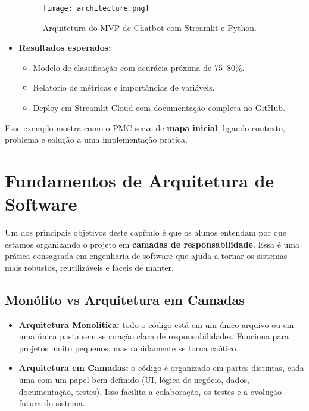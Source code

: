 \documentclass[12pt,a4paper]{article}
\begin{document}
\begin{itemize}
    \begin{figure}[H]
      \centering
      \texttt{[image: architecture.png]}
      \caption{Arquitetura do MVP de Chatbot com Streamlit e Python.}
    \end{figure}


  \item \textbf{Resultados esperados:}  
  \begin{itemize}
    \item Modelo de classificação com acurácia próxima de 75--80\%.  
    \item Relatório de métricas e importâncias de variáveis.  
    \item Deploy em Streamlit Cloud com documentação completa no GitHub.  
  \end{itemize}
\end{itemize}

Esse exemplo mostra como o PMC serve de \textbf{mapa inicial}, ligando contexto, problema e solução a uma implementação prática.



\clearpage
\section{Fundamentos de Arquitetura de Software}

Um dos principais objetivos deste capítulo é que os alunos entendam por que estamos organizando o projeto em \textbf{camadas de responsabilidade}. Essa é uma prática consagrada em engenharia de software que ajuda a tornar os sistemas mais robustos, reutilizáveis e fáceis de manter.

\subsection{Monólito vs Arquitetura em Camadas}

\begin{itemize}
  \item \textbf{Arquitetura Monolítica:} todo o código está em um único arquivo ou em uma única pasta sem separação clara de responsabilidades. Funciona para projetos muito pequenos, mas rapidamente se torna caótico.
  \item \textbf{Arquitetura em Camadas:} o código é organizado em partes distintas, cada uma com um papel bem definido (UI, lógica de negócio, dados, documentação, testes). Isso facilita a colaboração, os testes e a evolução futura do sistema.
\end{itemize}
\end{document}

